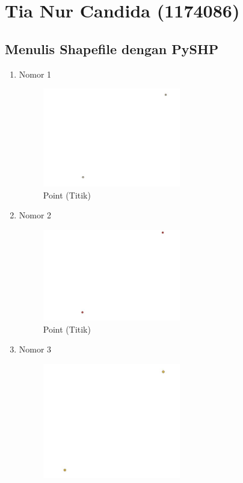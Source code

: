\section{Tia Nur Candida (1174086)}
\subsection{Menulis Shapefile dengan PySHP}
\begin{enumerate}
	\item Nomor 1
	
	\begin{figure}[H]
		\includegraphics[width=6cm]{figures/Tugas2/1174086/No1.jpg}
		\centering
		\caption{Point (Titik)}
	\end{figure}
	\item Nomor 2
	
	\begin{figure}[H]
		\includegraphics[width=6cm]{figures/Tugas2/1174086/No2.jpg}
		\centering
		\caption{Point (Titik)}
	\end{figure}
	\item Nomor 3
	
	\begin{figure}[H]
		\includegraphics[width=6cm]{figures/Tugas2/1174086/No3.jpg}

\end{figure}
\end{enumerate}
